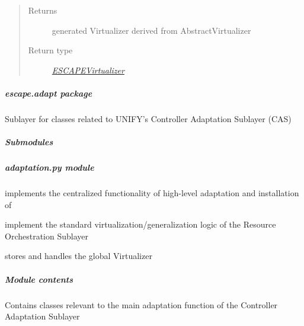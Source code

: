 \documentclass[letterpaper,10pt,english]{sphinxmanual}
\begin{document}
\begin{fulllineitems}
\begin{fulllineitems}
\begin{quote}
\begin{description}
\item[{Returns}] \leavevmode
generated Virtualizer derived from AbstractVirtualizer

\item[{Return type}] \leavevmode
{\hyperref[orchest/virtualization_mgmt:escape.orchest.virtualization_mgmt.ESCAPEVirtualizer]{\emph{ESCAPEVirtualizer}}}

\end{description}\end{quote}

\end{fulllineitems}


\end{fulllineitems}



\subparagraph{\emph{escape.adapt} package}
\label{adapt/adapt:module-escape.adapt}\label{adapt/adapt::doc}\label{adapt/adapt:escape-adapt-package}
Sublayer for classes related to UNIFY's Controller Adaptation Sublayer (CAS)


\subparagraph{Submodules}
\label{adapt/adapt:submodules}

\subparagraph{\emph{adaptation.py} module}
\label{adapt/adaptation::doc}\label{adapt/adaptation:adaptation-py-module}
{\hyperref[adapt/adaptation:escape.adapt.adaptation.ControllerAdapter]{\emph{}}} implements the centralized functionality of
high-level adaptation and installation of {\hyperref[util/nffg:escape.util.nffg.NFFG]{\emph{}}}

{\hyperref[adapt/adaptation:escape.adapt.adaptation.DomainVirtualizer]{\emph{}}} implement the standard virtualization/generalization
logic of the Resource Orchestration Sublayer

{\hyperref[adapt/adaptation:escape.adapt.adaptation.DomainResourceManager]{\emph{}}} stores and handles the global Virtualizer


\subparagraph{Module contents}
\label{adapt/adaptation:module-escape.adapt.adaptation}\label{adapt/adaptation:module-contents}
Contains classes relevant to the main adaptation function of the Controller
Adaptation Sublayer
\end{document}
